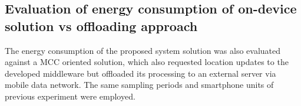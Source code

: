 \documentclass[ENG,PhD]{cinvestav}
\begin{document}
\subsection{Evaluation of energy consumption of on-device solution vs offloading approach}
The energy consumption of the proposed system solution was also evaluated against a MCC oriented solution, which also requested location updates to the developed middleware but offloaded its processing to an external server via mobile data network.
The same sampling periods and smartphone units of previous experiment were employed.


\begin{table}
\centering
{}
\end{table}
\end{document}
